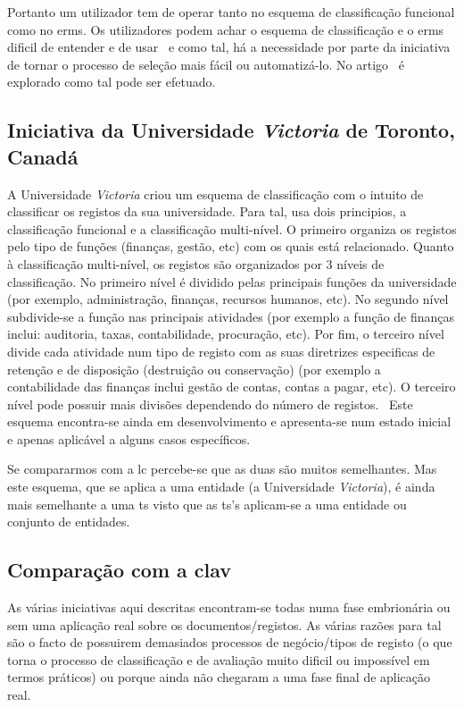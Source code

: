 Portanto um utilizador tem de operar tanto no esquema de classificação funcional como no \acrshort{erms}. Os utilizadores podem achar o esquema de classificação e o \acrshort{erms} dificil de entender e de usar~\cite{finInit} e como tal, há a necessidade por parte da iniciativa de tornar o processo de seleção mais fácil ou automatizá-lo. No artigo~\cite{finInit} é explorado como tal pode ser efetuado.

\subsection{Iniciativa da Universidade \textit{Victoria} de Toronto, Canadá}

A Universidade \textit{Victoria} criou um esquema de classificação com o intuito de classificar os registos da sua universidade. Para tal, usa dois principios, a classificação funcional e a classificação multi-nível. O primeiro organiza os registos pelo tipo de funções (finanças, gestão, etc) com os quais está relacionado. Quanto à classificação multi-nível, os registos são organizados por 3 níveis de classificação. No primeiro nível é dividido pelas principais funções da universidade (por exemplo, administração, finanças, recursos humanos, etc). No segundo nível subdivide-se a função nas principais atividades (por exemplo a função de finanças inclui: auditoria, taxas, contabilidade, procuração, etc). Por fim, o terceiro nível divide cada atividade num tipo de registo com as suas diretrizes especificas de retenção e de disposição (destruição ou conservação) (por exemplo a contabilidade das finanças inclui gestão de contas, contas a pagar, etc). O terceiro nível pode possuir mais divisões dependendo do número de registos.~\cite{uniInit} Este esquema encontra-se ainda em desenvolvimento e apresenta-se num estado inicial e apenas aplicável a alguns casos específicos.

Se compararmos com a \acrshort{lc} percebe-se que as duas são muitos semelhantes. Mas este esquema, que se aplica a uma entidade (a Universidade \textit{Victoria}), é ainda mais semelhante a uma \acrshort{ts} visto que as \acrshort{ts}'s aplicam-se a uma entidade ou conjunto de entidades.

\subsection{Comparação com a \acrshort{clav}}

As várias iniciativas aqui descritas encontram-se todas numa fase embrionária ou sem uma aplicação real sobre os documentos/registos. As várias razões para tal são o facto de possuirem demasiados processos de negócio/tipos de registo (o que torna o processo de classificação e de avaliação muito dificil ou impossível em termos práticos) ou porque ainda não chegaram a uma fase final de aplicação real.

